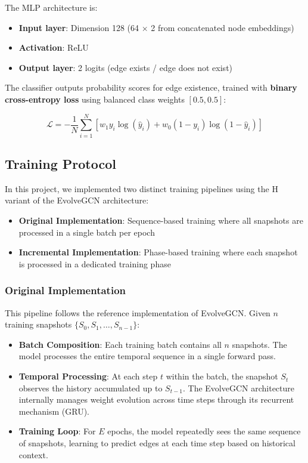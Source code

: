 The MLP architecture is:
\begin{itemize}
	\item \textbf{Input layer}: Dimension 128 (64 $\times$ 2 from concatenated node embeddings)
	\item \textbf{Activation}: ReLU
	\item \textbf{Output layer}: 2 logits (edge exists / edge does not exist)
\end{itemize}

The classifier outputs probability scores for edge existence, trained with \textbf{binary cross-entropy loss} using balanced class weights $[0.5, 0.5]$:

\begin{equation}
	\mathcal{L} = -\frac{1}{N} \sum_{i=1}^N \left[ w_1 y_i \log(\hat{y}_i) + w_0 (1 - y_i) \log(1 - \hat{y}_i) \right]
\end{equation}

\subsection{Training Protocol}

In this project, we implemented two distinct training pipelines using the H variant of the EvolveGCN architecture:

\begin{itemize}
	\item \textcolor{drawred}{\textbf{Original Implementation}}: Sequence-based training where all snapshots are processed in a single batch per epoch
	\item \textcolor{drawblue}{\textbf{Incremental Implementation}}: Phase-based training where each snapshot is processed in a dedicated training phase
\end{itemize}

\subsubsection*{Original Implementation}
\label{sec:original}

This pipeline follows the reference implementation of EvolveGCN. Given $n$ training snapshots $\{S_0, S_1, \dots, S_{n-1}\}$:

\begin{itemize}
	\item \textbf{Batch Composition}: Each training batch contains all $n$ snapshots. The model processes the entire temporal sequence in a single forward pass.
	\item \textbf{Temporal Processing}: At each step $t$ within the batch, the snapshot $S_t$ observes the history accumulated up to $S_{t-1}$. The EvolveGCN architecture internally manages weight evolution across time steps through its recurrent mechanism (GRU).
	\item \textbf{Training Loop}: For $E$ epochs, the model repeatedly sees the same sequence of snapshots, learning to predict edges at each time step based on historical context.
\end{itemize}


